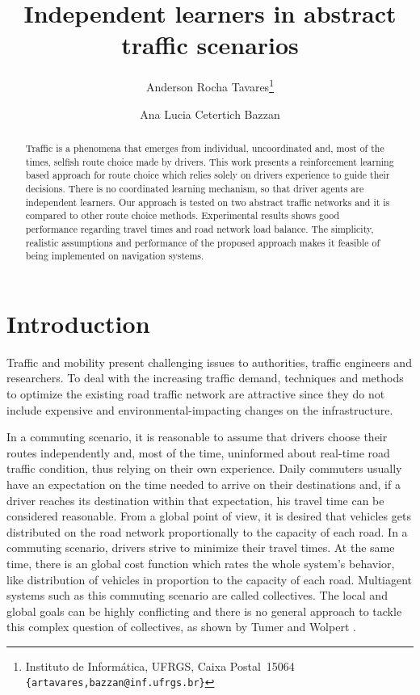 \documentclass{RITA}
\author{
  Anderson Rocha Tavares\footnote{Instituto de Inform\'atica, UFRGS, Caixa Postal~15064\\
  \texttt{\{artavares,bazzan@inf.ufrgs.br\}}}
  \and Ana Lucia Cetertich Bazzan\footnotemark[1]
}
\title{Independent learners in abstract traffic scenarios}
\begin{document}
\maketitle

\begin{abstract}
Traffic is a phenomena that emerges from individual, uncoordinated and, most of the times, selfish route choice made by drivers. This work presents a reinforcement learning based approach for route choice which relies solely on drivers experience to guide their decisions. There is no coordinated learning mechanism, so that driver agents are independent learners. Our approach is tested on two abstract traffic networks and it is compared to other route choice methods. Experimental results shows good performance regarding travel times and road network load balance. The simplicity, realistic assumptions and performance of the proposed approach makes it feasible of being implemented on navigation systems.
\end{abstract}





\section{Introduction}
\label{sec:intro}

Traffic and mobility present challenging issues to authorities, traffic engineers and researchers. To deal with the increasing traffic demand, techniques and methods to optimize the existing road traffic network are attractive since they do not include expensive and environmental-impacting changes on the infrastructure.

In a commuting scenario, it is reasonable to assume that drivers choose their routes independently and, most of the time, uninformed about real-time road traffic condition, thus relying on their own experience. Daily commuters usually have an expectation on the time needed to arrive on their destinations and, if a driver reaches its destination within that expectation, his travel time can be considered  reasonable. From a global point of view, it is desired that vehicles gets distributed on the road network proportionally to the capacity of each road. In a commuting scenario, drivers strive to minimize their travel times. At the same time, there is an global cost function which rates the whole system's behavior, like distribution of vehicles in proportion to the capacity of each road. Multiagent systems such as this commuting scenario are called collectives. The local and global goals can be highly conflicting and there is no general approach to tackle this complex question of collectives, as shown by Tumer and Wolpert \cite{Tumer&Wolpert2004}.
\end{document}
